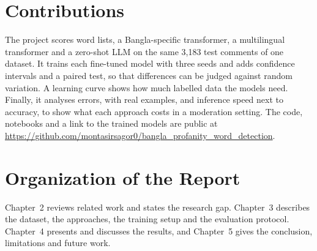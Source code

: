 \section{Contributions}

The project scores word lists, a Bangla-specific transformer, a multilingual transformer and a zero-shot LLM on the same 3,183 test comments of one dataset. It trains each fine-tuned model with three seeds and adds confidence intervals and a paired test, so that differences can be judged against random variation. A learning curve shows how much labelled data the models need. Finally, it analyses errors, with real examples, and inference speed next to accuracy, to show what each approach costs in a moderation setting. The code, notebooks and a link to the trained models are public at \url{https://github.com/montasirsagor0/bangla_profanity_word_detection}.

\section{Organization of the Report}

Chapter~2 reviews related work and states the research gap. Chapter~3 describes the dataset, the approaches, the training setup and the evaluation protocol. Chapter~4 presents and discusses the results, and Chapter~5 gives the conclusion, limitations and future work.
